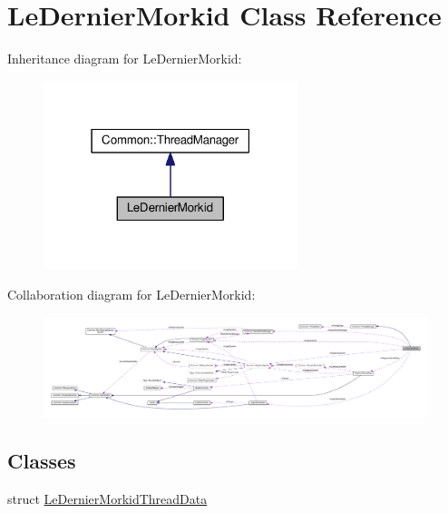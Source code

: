 \hypertarget{class_le_dernier_morkid}{}\section{Le\+Dernier\+Morkid Class Reference}
\label{class_le_dernier_morkid}


Inheritance diagram for Le\+Dernier\+Morkid\+:\nopagebreak
\begin{figure}[H]
\begin{center}
\leavevmode
\includegraphics[width=210pt]{class_le_dernier_morkid__inherit__graph}
\end{center}
\end{figure}


Collaboration diagram for Le\+Dernier\+Morkid\+:\nopagebreak
\begin{figure}[H]
\begin{center}
\leavevmode
\includegraphics[width=350pt]{class_le_dernier_morkid__coll__graph}
\end{center}
\end{figure}
\subsection*{Classes}
\begin{DoxyCompactItemize}
\item 
struct \hyperlink{struct_le_dernier_morkid_1_1_le_dernier_morkid_thread_data}{Le\+Dernier\+Morkid\+Thread\+Data}
\end{DoxyCompactItemize}
